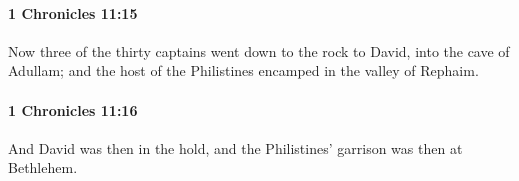 		\paragraph{1 Chronicles 11:15} %
			\label{1CHRONICLES-11-15}

			Now three of the thirty captains went down to the rock to David, into the cave of Adullam; and the host of the Philistines encamped in the valley of Rephaim.


		\paragraph{1 Chronicles 11:16} %
			\label{1CHRONICLES-11-16}

			And David was then in the hold, and the Philistines’ garrison was then at Bethlehem.


